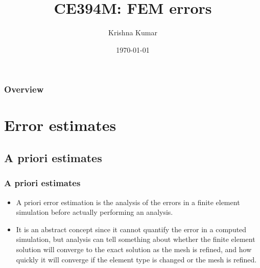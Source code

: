 \documentclass[notes]{beamer}
\title[CE394M: errors]{CE394M: FEM errors}
\author{Krishna Kumar} %
\institute[UT Austin] %
{
University of Texas at Austin \\
\medskip
\textit{
  \url{krishnak@utexas.edu}} %
}
\date{\today} %
\begin{document}
\begin{frame}
\titlepage %
\end{frame}

\begin{frame}
 \frametitle{Overview}
 \tableofcontents
\end{frame}


\section{Error estimates}
\subsection{A priori estimates}

\begin{frame}
\frametitle{A priori estimates}
	\begin{itemize}
		\item 	A priori error estimation is the analysis of the errors in a finite element simulation before
		actually performing an analysis. 
		\item It is an abstract concept since it cannot quantify the
		error in a computed simulation, but analysis can tell something about whether the finite
		element solution will converge to the exact solution as the mesh is refined, and how
		quickly it will converge if the element type is changed or the mesh is refined.

	\end{itemize}
\end{frame}
\end{document}
